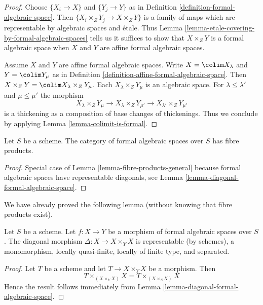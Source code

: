 \begin{proof}
Choose $\{X_i \to X\}$ and $\{Y_j \to Y\}$ as in
Definition \ref{definition-formal-algebraic-space}.
Then $\{X_i \times_Z Y_j \to X \times_Z Y\}$ is a family
of maps which are representable by algebraic spaces and \'etale.
Thus Lemma \ref{lemma-etale-covering-by-formal-algebraic-spaces}
tells us it suffices to show that $X \times_Z Y$ is a formal
algebraic space when $X$ and $Y$ are affine formal algebraic spaces.

\medskip\noindent
Assume $X$ and $Y$ are affine formal algebraic spaces.
Write $X = \colim X_\lambda$ and $Y = \colim Y_\mu$ as
in Definition \ref{definition-affine-formal-algebraic-space}.
Then $X \times_Z Y = \colim X_\lambda \times_Z Y_\mu$.
Each $X_\lambda \times_Z Y_\mu$ is an algebraic space.
For $\lambda \leq \lambda'$ and $\mu \leq \mu'$ the morphism
$$
X_\lambda \times_Z Y_\mu \to
X_\lambda \times_Z Y_{\mu'} \to
X_{\lambda'} \times_Z Y_{\mu'}
$$
is a thickening as a composition of base changes of thickenings.
Thus we conclude by applying Lemma \ref{lemma-colimit-is-formal}.
\end{proof}

\begin{lemma}
\label{lemma-fibre-products}
Let $S$ be a scheme. The category of formal algebraic spaces over $S$
has fibre products.
\end{lemma}

\begin{proof}
Special case of Lemma \ref{lemma-fibre-products-general}
because formal algebraic spaces have representable diagonals, see
Lemma \ref{lemma-diagonal-formal-algebraic-space}.
\end{proof}

\noindent
We have already proved the following lemma (without knowing that
fibre products exist).

\begin{lemma}
\label{lemma-diagonal-morphism-formal-algebraic-spaces}
Let $S$ be a scheme. Let $f : X \to Y$ be a morphism of formal algebraic spaces
over $S$. The diagonal morphism $\Delta : X \to X \times_Y X$
is representable (by schemes), a monomorphism, locally quasi-finite,
locally of finite type, and separated.
\end{lemma}

\begin{proof}
Let $T$ be a scheme and let $T \to X \times_Y X$ be a morphism.
Then
$$
T \times_{(X \times_Y X)} X = T \times_{(X \times_S X)} X
$$
Hence the result follows immediately from
Lemma \ref{lemma-diagonal-formal-algebraic-space}.
\end{proof}






